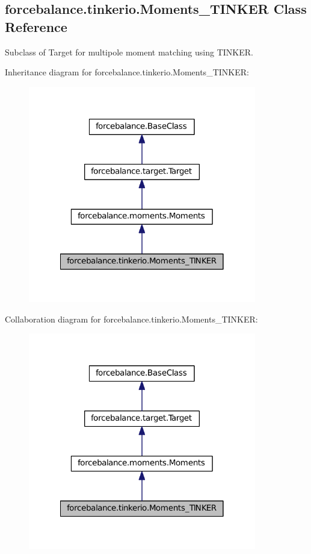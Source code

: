 \hypertarget{classforcebalance_1_1tinkerio_1_1Moments__TINKER}{\subsection{forcebalance.\-tinkerio.\-Moments\-\_\-\-T\-I\-N\-K\-E\-R \-Class \-Reference}
\label{classforcebalance_1_1tinkerio_1_1Moments__TINKER}
}


\-Subclass of \-Target for multipole moment matching using \-T\-I\-N\-K\-E\-R.  




\-Inheritance diagram for forcebalance.\-tinkerio.\-Moments\-\_\-\-T\-I\-N\-K\-E\-R\-:\nopagebreak
\begin{figure}[H]
\begin{center}
\leavevmode
\includegraphics[width=282pt]{classforcebalance_1_1tinkerio_1_1Moments__TINKER__inherit__graph}
\end{center}
\end{figure}


\-Collaboration diagram for forcebalance.\-tinkerio.\-Moments\-\_\-\-T\-I\-N\-K\-E\-R\-:\nopagebreak
\begin{figure}[H]
\begin{center}
\leavevmode
\includegraphics[width=282pt]{classforcebalance_1_1tinkerio_1_1Moments__TINKER__coll__graph}
\end{center}
\end{figure}
